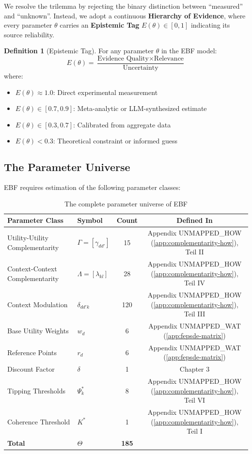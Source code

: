 \documentclass[11pt,a4paper]{article}
\theoremstyle{definition}
\newtheorem{definition}{Definition}[section]
\begin{document}
We resolve the trilemma by rejecting the binary distinction between ``measured'' 
and ``unknown''. Instead, we adopt a continuous \textbf{Hierarchy of Evidence}, 
where every parameter $\theta$ carries an \textbf{Epistemic Tag} $E(\theta) \in [0, 1]$ 
indicating its source reliability.

\begin{definition}[Epistemic Tag]
\label{def:epistemic-tag}
For any parameter $\theta$ in the EBF model:
\begin{equation}
E(\theta) = \frac{\text{Evidence Quality} \times \text{Relevance}}{\text{Uncertainty}}
\end{equation}
where:
\begin{itemize}
    \item $E(\theta) \approx 1.0$: Direct experimental measurement
    \item $E(\theta) \in [0.7, 0.9]$: Meta-analytic or LLM-synthesized estimate
    \item $E(\theta) \in [0.3, 0.7]$: Calibrated from aggregate data
    \item $E(\theta) < 0.3$: Theoretical constraint or informed guess
\end{itemize}
\end{definition}

\subsection{The Parameter Universe}

EBF requires estimation of the following parameter classes:

\begin{table}[h]
\centering
\begin{tabular}{llcc}
\toprule
\textbf{Parameter Class} & \textbf{Symbol} & \textbf{Count} & \textbf{Defined In} \\
\midrule
Utility-Utility Complementarity & $\Gamma = [\gamma_{dd'}]$ & 15 & Appendix UNMAPPED_HOW (\ref{app:complementarity-how}), Teil II \\
Context-Context Complementarity & $\Lambda = [\lambda_{kl}]$ & 28 & Appendix UNMAPPED_HOW (\ref{app:complementarity-how}), Teil IV \\
Context Modulation & $\delta_{dd'k}$ & 120 & Appendix UNMAPPED_HOW (\ref{app:complementarity-how}), Teil III \\
Base Utility Weights & $w_d$ & 6 & Appendix UNMAPPED_WAT (\ref{app:fepsde-matrix}) \\
Reference Points & $r_d$ & 6 & Appendix UNMAPPED_WAT (\ref{app:fepsde-matrix}) \\
Discount Factor & $\delta$ & 1 & Chapter 3 \\
Tipping Thresholds & $\Psi^*_k$ & 8 & Appendix UNMAPPED_HOW (\ref{app:complementarity-how}), Teil VI \\
Coherence Threshold & $K^*$ & 1 & Appendix UNMAPPED_HOW (\ref{app:complementarity-how}), Teil I \\
\midrule
\textbf{Total} & $\Theta$ & \textbf{185} & \\
\bottomrule
\end{tabular}
\caption{The complete parameter universe of EBF}
\label{tab:parameter-universe}
\end{table}
\end{document}
